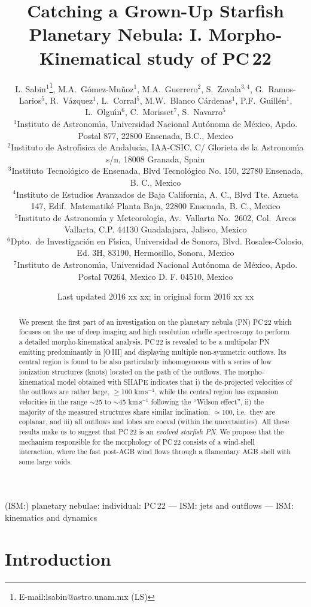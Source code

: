 \documentclass[fleqn,usenatbib,useAMS]{mnras}
\title[Properties of PC\,22]{Catching a Grown-Up Starfish Planetary Nebula: I. Morpho-Kinematical study of PC\,22}
\author[L. Sabin et al.] 
{L. Sabin$^{1}$\thanks{E-mail:lsabin@astro.unam.mx (LS)},
M.A.\ G\'omez-Mu\~noz$^{1}$,
M.A.\ Guerrero$^{2}$,
S.\ Zavala$^{3,4}$,
G.\ Ramos-Larios$^{5}$,
\newauthor R.\ V\'azquez$^{1}$,
L.\ Corral$^{5}$,
M.W.\ Blanco C\'ardenas$^{1}$,
P.F.\ Guill\'en$^{1}$,
L.\ Olgu\'{\i}n$^{6}$,
C.\ Morisset$^{7}$,
\newauthor S.\ Navarro$^{5}$  \\  
$^{1}$Instituto de Astronom\'{\i}a, Universidad Nacional Aut\'onoma de M\'exico, Apdo. Postal 877, 22800 Ensenada, B.C., Mexico\\
$^{2}$Instituto de Astrof\'{\i}sica de Andaluc\'{\i}a, IAA-CSIC, C/ Glorieta de la Astronom\'{\i}a s/n, 18008 Granada, Spain\\
$^{3}$Instituto Tecnol\'ogico de Ensenada, Blvd Tecnol\'ogico No. 150, 22780 Ensenada, B. C., Mexico\\
$^{4}$Instituto de Estudios Avanzados de Baja California, A. C., Blvd Tte. Azueta 147, Edif.\ Matematik\'e Planta Baja, 22800 Ensenada, B. C., Mexico \\
$^{5}$Instituto de Astronom\'{\i}a y Meteorolog\'{\i}a, Av.\ Vallarta No.\ 2602, Col.\ Arcos Vallarta, C.P. 44130 Guadalajara, Jalisco, Mexico \\
$^{6}$Dpto.\ de Investigaci\'on en F\'{\i}sica, Universidad de Sonora, Blvd. Rosales-Colosio, Ed. 3H, 83190, Hermosillo, Sonora, Mexico \\
$^{7}$Instituto de Astronom\'{\i}a, Universidad Nacional Aut\'onoma de M\'exico, Apdo. Postal 70264, Mexico D. F. 04510, Mexico}
\date{Last updated 2016 xx xx; in original form 2016 xx xx}
\begin{document}
\label{firstpage}
\pagerange{\pageref{firstpage}--\pageref{lastpage}}
\maketitle


\begin{abstract}

We present the first part of an investigation on the planetary nebula (PN)
PC\,22 which focuses on the use of deep imaging and high resolution echelle
spectroscopy to perform a detailed morpho-kinematical analysis.
PC\,22 is revealed to be a multipolar PN emitting predominantly in
{[O\,{\sevensize III}]} and displaying multiple non-symmetric outflows.
Its central region is found to be also particularly inhomogeneous with
a series of low ionization structures (knots) located on the path of
the outflows.
The morpho-kinematical model obtained with {\sc SHAPE} indicates that
i) the de-projected velocities of the outflows are rather large, $\geq$100
km\,s$^{-1}$, while the central region has expansion velocities in the
range $\sim$25 to $\sim$45 km\,s$^{-1}$ following the ``Wilson effect'',
ii) the majority of the measured structures share similar inclination,
$\simeq$100\degr, i.e.\ they are coplanar, and
iii) all outflows and lobes are coeval (within the uncertainties). All these results make us to suggest that PC\,22 is an {\it evolved starfish PN}.
We propose that the mechanism responsible for the morphology of PC\,22
consists of a wind-shell interaction, where the fast post-AGB wind flows
through a filamentary AGB shell with some large voids.
  
\end{abstract}

\begin{keywords}
(ISM:) planetary nebulae: individual: PC\,22 --- 
ISM: jets and outflows --- ISM: kinematics and dynamics
\end{keywords}


\section{Introduction}
\end{document}
